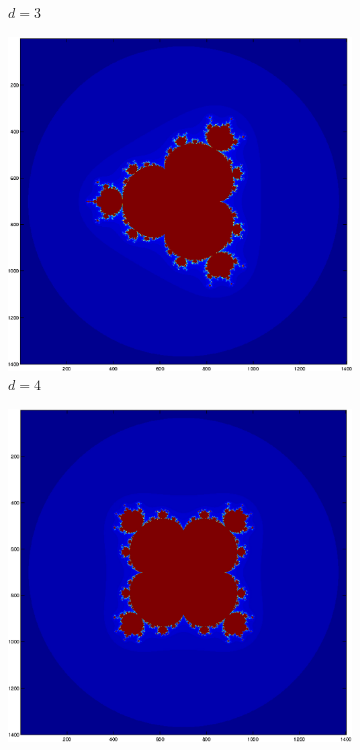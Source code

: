 \documentclass[a4wide, 10pt]{article}
\begin{document}
\begin{figure}[H]
\begin{subfigure}[b]{0.18\textwidth}
                \caption{$d = 3$}
        \end{subfigure}
        \begin{subfigure}[b]{0.18\textwidth}
                \includegraphics[width=\textwidth]{EPSFiles/Mandelbrot_Power_4}
                \caption{$d = 4$}
        \end{subfigure}  
        \begin{subfigure}[b]{0.18\textwidth}
                \includegraphics[width=\textwidth]{EPSFiles/Mandelbrot_Power_5}

\end{subfigure}
\end{figure}
\end{document}
